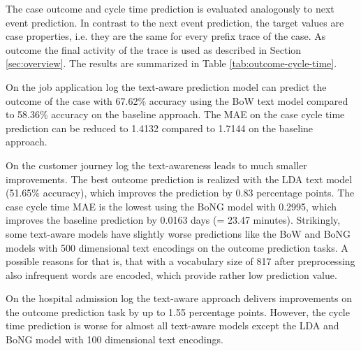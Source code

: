 The case outcome and cycle time prediction is evaluated analogously to next event prediction.
In contrast to the next event prediction, the target values are case properties, i.e. they are the same for every prefix trace of the case.
As outcome the final activity of the trace is used as described in Section \ref{sec:overview}.
The results are summarized in Table \ref{tab:outcome-cycle-time}.

On the job application log the text-aware prediction model can predict the outcome of the case with 67.62\% accuracy using the BoW text model compared to 58.36\% accuracy on the baseline approach.
The MAE on the case cycle time prediction can be reduced to 1.4132 compared to 1.7144 on the baseline approach.

On the customer journey log the text-awareness leads to much smaller improvements.
The best outcome prediction is realized with the LDA text model (51.65\% accuracy), which improves the prediction by 0.83 percentage points.
The case cycle time MAE is the lowest using the BoNG model with 0.2995, which improves the baseline prediction by 0.0163 days (= 23.47 minutes).
Strikingly, some text-aware models have slightly worse predictions like the BoW and BoNG models with 500 dimensional text encodings on the outcome prediction tasks.
A possible reasons for that is, that with a vocabulary size of 817 after preprocessing also infrequent words are encoded, which provide rather low prediction value.

On the hospital admission log the text-aware approach delivers improvements on the outcome prediction task by up to 1.55 percentage points.
However, the cycle time prediction is worse for almost all text-aware models except the LDA and BoNG model with 100 dimensional text encodings.








